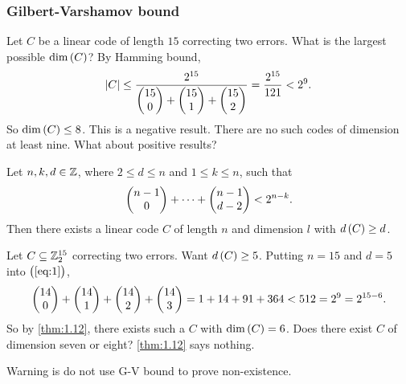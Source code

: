 \pagebreak

\subsubsection{Gilbert-Varshamov bound}

\begin{example*}
Let $ C $ be a linear code of length $ 15 $ correcting two errors. What is the largest possible $ \dim\br{C} $? By Hamming bound,
$$ \abs{C} \le \dfrac{2^{15}}{\begin{pmatrix} 15 \\ 0 \end{pmatrix} + \begin{pmatrix} 15 \\ 1 \end{pmatrix} + \begin{pmatrix} 15 \\ 2 \end{pmatrix}} = \dfrac{2^{15}}{121} < 2^9. $$
So $ \dim\br{C} \le 8 $. This is a negative result. There are no such codes of dimension at least nine. What about positive results?
\end{example*}

\begin{theorem}[G-V bound]
\label{thm:1.12}
Let $ n, k, d \in \mathbb{Z} $, where $ 2 \le d \le n $ and $ 1 \le k \le n $, such that
\begin{equation}
\label{eq:1}
\begin{pmatrix} n - 1 \\ 0 \end{pmatrix} + \dots + \begin{pmatrix} n - 1 \\ d - 2 \end{pmatrix} < 2^{n - k}.
\end{equation}
Then there exists a linear code $ C $ of length $ n $ and dimension $ l $ with $ d\br{C} \ge d $.
\end{theorem}

\begin{example*}
Let $ C \subseteq \mathbb{Z}_2^{15} $ correcting two errors. Want $ d\br{C} \ge 5 $. Putting $ n = 15 $ and $ d = 5 $ into $ \br{\ref{eq:1}} $,
$$ \begin{pmatrix} 14 \\ 0 \end{pmatrix} + \begin{pmatrix} 14 \\ 1 \end{pmatrix} + \begin{pmatrix} 14 \\ 2 \end{pmatrix} + \begin{pmatrix} 14 \\ 3 \end{pmatrix} = 1 + 14 + 91 + 364 < 512 = 2^9 = 2^{15 - 6}. $$
So by \ref{thm:1.12}, there exists such a $ C $ with $ \dim\br{C} = 6 $. Does there exist $ C $ of dimension seven or eight? \ref{thm:1.12} says nothing.
\end{example*}

Warning is do not use G-V bound to prove non-existence.

